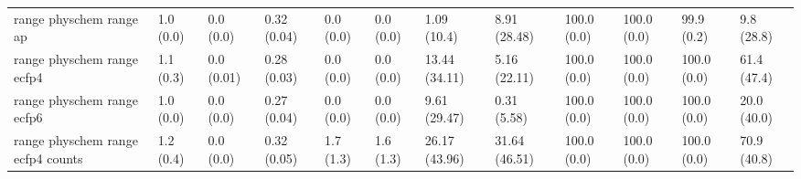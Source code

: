 \begin{tabular}{llllllllllll}
range physchem range ap & {\cellcolor[HTML]{F6FCFD}} \color[HTML]{000000} 1.0 (0.0) & {\cellcolor[HTML]{F7FCFD}} \color[HTML]{000000} 0.0 (0.0) & {\cellcolor[HTML]{AFE1D5}} \color[HTML]{000000} 0.32 (0.04) & {\cellcolor[HTML]{F7FCFD}} \color[HTML]{000000} 0.0 (0.0) & {\cellcolor[HTML]{F7FCFD}} \color[HTML]{000000} 0.0 (0.0) & {\cellcolor[HTML]{F6FCFD}} \color[HTML]{000000} 1.09 (10.4) & {\cellcolor[HTML]{EBF7FA}} \color[HTML]{000000} 8.91 (28.48) & {\cellcolor[HTML]{00441B}} \color[HTML]{F1F1F1} 100.0 (0.0) & {\cellcolor[HTML]{00441B}} \color[HTML]{F1F1F1} 100.0 (0.0) & {\cellcolor[HTML]{00441B}} \color[HTML]{F1F1F1} 99.9 (0.2) & {\cellcolor[HTML]{E9F7FA}} \color[HTML]{000000} 9.8 (28.8) \\
range physchem range ecfp4 & {\cellcolor[HTML]{F6FCFD}} \color[HTML]{000000} 1.1 (0.3) & {\cellcolor[HTML]{F7FCFD}} \color[HTML]{000000} 0.0 (0.01) & {\cellcolor[HTML]{C0E7DF}} \color[HTML]{000000} 0.28 (0.03) & {\cellcolor[HTML]{F7FCFD}} \color[HTML]{000000} 0.0 (0.0) & {\cellcolor[HTML]{F7FCFD}} \color[HTML]{000000} 0.0 (0.0) & {\cellcolor[HTML]{E3F4F8}} \color[HTML]{000000} 13.44 (34.11) & {\cellcolor[HTML]{F0F9FB}} \color[HTML]{000000} 5.16 (22.11) & {\cellcolor[HTML]{00441B}} \color[HTML]{F1F1F1} 100.0 (0.0) & {\cellcolor[HTML]{00441B}} \color[HTML]{F1F1F1} 100.0 (0.0) & {\cellcolor[HTML]{00441B}} \color[HTML]{F1F1F1} 100.0 (0.0) & {\cellcolor[HTML]{44AF79}} \color[HTML]{F1F1F1} 61.4 (47.4) \\
range physchem range ecfp6 & {\cellcolor[HTML]{F6FCFD}} \color[HTML]{000000} 1.0 (0.0) & {\cellcolor[HTML]{F7FCFD}} \color[HTML]{000000} 0.0 (0.0) & {\cellcolor[HTML]{C5E9E2}} \color[HTML]{000000} 0.27 (0.04) & {\cellcolor[HTML]{F7FCFD}} \color[HTML]{000000} 0.0 (0.0) & {\cellcolor[HTML]{F7FCFD}} \color[HTML]{000000} 0.0 (0.0) & {\cellcolor[HTML]{E9F7FA}} \color[HTML]{000000} 9.61 (29.47) & {\cellcolor[HTML]{F7FCFD}} \color[HTML]{000000} 0.31 (5.58) & {\cellcolor[HTML]{00441B}} \color[HTML]{F1F1F1} 100.0 (0.0) & {\cellcolor[HTML]{00441B}} \color[HTML]{F1F1F1} 100.0 (0.0) & {\cellcolor[HTML]{00441B}} \color[HTML]{F1F1F1} 100.0 (0.0) & {\cellcolor[HTML]{D6F0EE}} \color[HTML]{000000} 20.0 (40.0) \\
range physchem range ecfp4 counts & {\cellcolor[HTML]{F6FCFD}} \color[HTML]{000000} 1.2 (0.4) & {\cellcolor[HTML]{F7FCFD}} \color[HTML]{000000} 0.0 (0.0) & {\cellcolor[HTML]{B0E1D6}} \color[HTML]{000000} 0.32 (0.05) & {\cellcolor[HTML]{F5FBFC}} \color[HTML]{000000} 1.7 (1.3) & {\cellcolor[HTML]{F5FBFC}} \color[HTML]{000000} 1.6 (1.3) & {\cellcolor[HTML]{C7EAE3}} \color[HTML]{000000} 26.17 (43.96) & {\cellcolor[HTML]{B0E1D6}} \color[HTML]{000000} 31.64 (46.51) & {\cellcolor[HTML]{00441B}} \color[HTML]{F1F1F1} 100.0 (0.0) & {\cellcolor[HTML]{00441B}} \color[HTML]{F1F1F1} 100.0 (0.0) & {\cellcolor[HTML]{00441B}} \color[HTML]{F1F1F1} 100.0 (0.0) & {\cellcolor[HTML]{2D9655}} \color[HTML]{F1F1F1} 70.9 (40.8) \\

\end{tabular}
